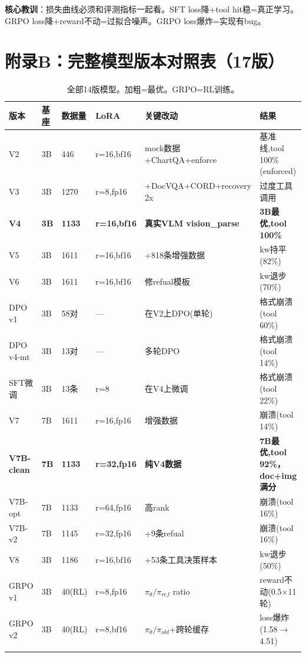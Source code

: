 \documentclass[fontset=none,11pt,a4paper]{ctexart}
\begin{document}
\textbf{核心教训}：损失曲线必须和评测指标一起看。SFT loss降+tool hit稳=真正学习。GRPO loss降+reward不动=过拟合噪声。GRPO loss爆炸=实现有bug。

\section{附录B：完整模型版本对照表（17版）}

\begin{longtable}{lllllp{3.5cm}}
\toprule
版本 & 基座 & 数据量 & LoRA & 关键改动 & 结果 \\
\midrule
V2 & 3B & 446 & r=16,bf16 & mock数据+ChartQA+enforce & 基准线,tool 100\%(enforced) \\
V3 & 3B & 1270 & r=8,fp16 & +DocVQA+CORD+recovery 2x & 过度工具调用 \\
\addlinespace
\textbf{V4} & \textbf{3B} & \textbf{1133} & \textbf{r=16,bf16} & \textbf{真实VLM vision\_parse} & \textbf{3B最优,tool 100\%} \\
\addlinespace
V5 & 3B & 1611 & r=16,bf16 & +818条增强数据 & kw持平(82\%) \\
V6 & 3B & 1611 & r=16,bf16 & 修refual模板 & kw退步(70\%) \\
\addlinespace
DPO v1 & 3B & 58对 & --- & 在V2上DPO(单轮) & 格式崩溃(tool 60\%) \\
DPO v4-mt & 3B & 13对 & --- & 多轮DPO & 格式崩溃(tool 14\%) \\
SFT微调 & 3B & 13条 & r=8 & 在V4上微调 & 格式崩溃(tool 22\%) \\
\addlinespace
V7 & 7B & 1611 & r=16,fp16 & 增强数据 & 崩溃(tool 14\%) \\
\textbf{V7B-clean} & \textbf{7B} & \textbf{1133} & \textbf{r=32,fp16} & \textbf{纯V4数据} & \textbf{7B最优,tool 92\%，doc+img满分} \\
V7B-opt & 7B & 1133 & r=64,fp16 & 高rank & 崩溃(tool 16\%) \\
V7B-v2 & 7B & 1145 & r=32,fp16 & +9条refual & 崩溃(tool 16\%) \\
\addlinespace
V8 & 3B & 1186 & r=16,bf16 & +53条工具决策样本 & kw退步(50\%) \\
\addlinespace
GRPO v1 & 3B & 40(RL) & r=8,fp16 & $\pi_\theta/\pi_{ref}$ ratio & reward不动(0.5$\times$11轮) \\
GRPO v2 & 3B & 40(RL) & r=8,bf16 & $\pi_\theta/\pi_{old}$+跨轮缓存 & loss爆炸(1.58$\to$4.51) \\
\bottomrule
\caption{全部14版模型。加粗=最优。GRPO=RL训练。}
\end{longtable}
\end{document}
